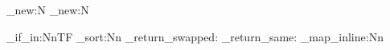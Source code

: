 
\usepackage{expl3}
\usepackage{etoolbox}
\usepackage[
style=ieee,
citestyle=authoryear,
maxnames=3
]{biblatex}


\ExplSyntaxOn

\clist_new:N \scncitenames
\prop_new:N \scncitelist

\NewDocumentCommand {} 
{
    \prop_if_in:NnTF 
}
\NewDocumentCommand \printscnbiblio {} 
{
    \clist_sort:Nn \scncitenames
    {
        { \sort_return_swapped: }
        { \sort_return_same: }
    }
    \clist_map_inline:Nn 
}
\ExplSyntaxOff

\newcommand{\scncite}[1]{
\scncitecommon{#1}{\cite{#1}}
}

\newcommand{\scncitecommon}[2]{
\hspace{-0.6em}\textit{#2}\hspace{-0.8em}
\addcite{#2}{\printscncite{#1}{#2}}
}

\newcommand{\printscncite}[2]{
\scnheader{#2}
\scntext{библиографическая ссылка}{\fullcite{#1}}
}